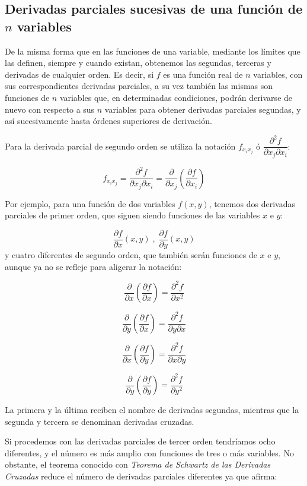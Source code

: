 \subsection{Derivadas parciales sucesivas de una función de $n$
variables}

De la misma forma que en las funciones de una variable, mediante los
límites que las definen, siempre y cuando existan, obtenemos las
segundas, terceras y derivadas de cualquier orden. Es decir, si $f$
es una función real de $n$ variables, con sus correspondientes
derivadas parciales, a su vez también las mismas son funciones de
$n$ variables que, en determinadas condiciones, podrán derivarse de
nuevo con respecto a sus $n$ variables para obtener derivadas
parciales segundas, y así sucesivamente hasta órdenes superiores de
derivación.

Para la derivada parcial de segundo orden se utiliza la notación
$f_{x_ix_j}$ ó $\dfrac{{\partial ^2 f}} {{\partial x_j \partial x_i
}}$:


\[
f_{x_i x_j }  = \frac{{\partial ^2 f}} {{\partial x_j \partial x_i
}} = \frac{\partial } {{\partial x_j }}\left( {\frac{{\partial f}}
{{\partial x_i }}} \right)
\]

Por ejemplo, para una función de dos variables $f(x,y)$, tenemos dos
derivadas parciales de primer orden, que siguen siendo funciones de
las variables $x$ e $y$:

\[
\frac{{\partial f}} {{\partial x}}(x,y)\; ,\; \frac{{\partial f}}
{{\partial y}}(x,y)
\]
y cuatro diferentes de segundo orden, que también serán funciones de
$x$ e $y$, aunque ya no se refleje para aligerar la notación:


\[
\frac{\partial } {{\partial x}}\left( {\frac{{\partial f}}
{{\partial x}}} \right) = \frac{{\partial ^2 f}} {{\partial x^2 }}
\]

\[
\frac{\partial } {{\partial y}}\left( {\frac{{\partial f}}
{{\partial x}}} \right) = \frac{{\partial ^2 f}} {{\partial
y\partial x}}
\]


\[
\frac{\partial } {{\partial x}}\left( {\frac{{\partial f}}
{{\partial y}}} \right) = \frac{{\partial ^2 f}} {{\partial
x\partial y}}
\]

\[
\frac{\partial } {{\partial y}}\left( {\frac{{\partial f}}
{{\partial y}}} \right) = \frac{{\partial ^2 f}} {{\partial y^2 }}
\]

La primera y la última reciben el nombre de derivadas segundas,
mientras que la segunda y tercera se denominan derivadas cruzadas.

Si procedemos con las derivadas parciales de tercer orden tendríamos
ocho diferentes, y el número es más amplio con funciones de tres o
más variables. No obstante, el teorema conocido con \emph{Teorema de
Schwartz de las Derivadas Cruzadas} reduce el número de derivadas
parciales diferentes ya que afirma:

